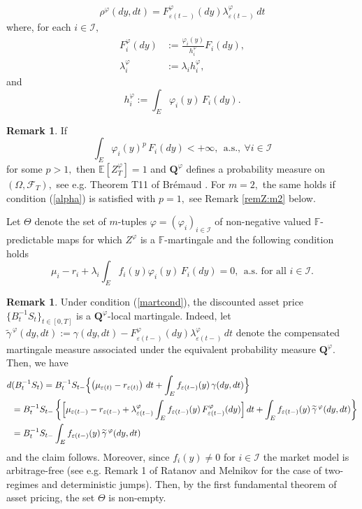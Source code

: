 \documentclass[11pt]{article}
\theoremstyle{plain}
\theoremstyle{definition}
\newtheorem{remark}[theorem]{Remark}
\numberwithin{equation}{section}
\newcommand{\calF}{\mathcal{F}}
\newcommand{\calI}{\mathcal{I}}
\newcommand{\eps}{\varepsilon}
\newcommand{\Exp}{\mathds{E}}
\newcommand{\Fil}{\mathds{F}}
\newcommand{\Qbf}{\mathbf{Q}}
\begin{document}
\[
\rho^\varphi(dy,dt)=F_{\eps(t-)}^\varphi(dy)\lambda_{\eps(t-)}^\varphi\,dt
\]
where, for each $i\in\calI,$
\begin{align*}
F_{i}^\varphi(dy)&:=\frac{\varphi_{i}(y)}{h_{i}^\varphi}F_{i}(dy),\\
\lambda_{i}^{\varphi}&:=\lambda_{i}h_{i}^\varphi,
\end{align*}
and
\[
h_{i}^\varphi:=\int_{E}\varphi_{i}(y)\,F_{i}(dy).
\]
\begin{remark}\label{martcondZ}
If
\begin{equation}\label{alpha}
\int_E\varphi_i(y)^p\,F_i(dy)<+\infty, \ \ \mbox{a.s.}, \ \forall i\in\mathcal{I}
\end{equation}
for some $p>1,$ then $\Exp[Z_T^\varphi]=1$ and $\Qbf^\varphi$ defines a probability measure on $(\Omega,\calF_T),$ see e.g. Theorem T11 of Br\'{e}maud \cite[Chapter VIII]{bremaud}. For $m=2,$ the same holds if condition (\ref{alpha}) is satisfied with $p=1,$ see Remark \ref{remZ:m2} below.
\end{remark}
Let $\Theta$ denote the set of $m$-tuples $\varphi=(\varphi_i)_{i\in\calI}$ of non-negative valued $\Fil$-predictable maps for which $Z^\varphi$ is a $\Fil$-martingale and the following condition holds
  \begin{equation}\label{martcond}
  \mu_i-r_i+\lambda_i\int_{E} f_i(y)\varphi_i(y)\,F_i(dy)=0, \ \ \mbox{a.s. for all }  i\in\calI.
  \end{equation}
\begin{remark}
Under condition (\ref{martcond}), the discounted asset price $\{B_t^{-1}S_t\}_{t\in[0,T]}$ is a $\Qbf^\varphi$-local martingale. Indeed, let $\widetilde{\gamma}^{\,\varphi}(dy,dt):=\gamma(dy,dt)-F_{\eps(t-)}^\varphi(dy)\lambda_{\eps(t-)}^\varphi\,dt$ denote the compensated martingale measure associated under the equivalent probability measure $\Qbf^\varphi.$ Then, we have
\begin{align*}
  d&(B_t^{-1}S_t)=B_t^{-1}S_{t-}\Bigl\{\left(\mu_{\eps(t)}-r_{\eps(t)}\right)\,dt+\int_{E} f_{\eps(t-)}(y)\,\gamma(dy,dt)\Bigr\}\\
  &=B_t^{-1}S_{t-}\left\{\Bigl[\mu_{\eps(t-)}-r_{\eps(t-)}+\lambda_{\eps(t-)}^\varphi\int_{E} f_{\eps(t-)}(y)\,F_{\eps(t-)}^\varphi(dy)\Bigr]\,dt+\int_{E} f_{\eps(t-)}(y)\,\widetilde{\gamma}^{\,\varphi}(dy,dt)\right\}\\
  &=B_t^{-1}S_{t-}\int_{E} f_{\eps(t-)}(y)\,\widetilde{\gamma}^{\,\varphi}(dy,dt)
\end{align*}
and the claim follows. Moreover, since $f_i(y)\neq 0$ for $i\in\calI$ the market model is arbitrage-free (see e.g. Remark 1 of Ratanov and Melnikov \cite{ratmel} for the case of two-regimes and deterministic jumps). Then, by the first fundamental theorem of asset pricing, the set $\Theta$ is non-empty.
\end{remark}
\end{document}

